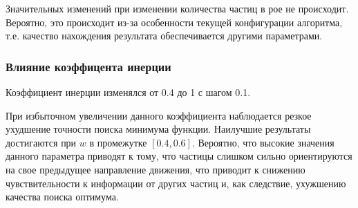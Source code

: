 \documentclass[12pt,a4paper]{article}
\begin{document}
Значительных изменений при изменении количества частиц в рое не происходит. Вероятно, это происходит из-за особенности текущей конфигурации алгоритма, т.е. качество нахождения результата обеспечивается другими параметрами.

\subsubsection{Влияние коэффицента инерции}
Коэффициент инерции изменялся от 0.4 до 1 с шагом 0.1.

\begin{table}[H]
    \centering
    \caption{Исследование влияния коэффициента инерции.}
    \label{tab:inertia}
\end{table}

При избыточном увеличении данного коэффициента наблюдается резкое ухудшение точности поиска минимума функции. Наилучшие результаты достигаются при $w$ в промежутке $[0.4, 0.6]$.
Вероятно, что высокие значения данного параметра приводят к тому, что частицы слишком сильно
ориентируются на свое предыдущее направление движения, что приводит к снижению чувствительности к информации от других частиц и, как следствие, ухужшению качества поиска оптимума.
\end{document}
